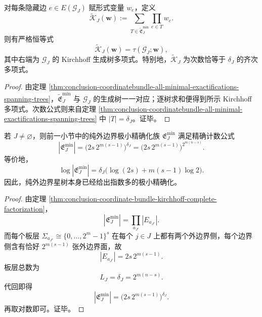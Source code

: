 \begin{corollary}\label{cor:conclusion-coordinatebundle-full-exactification-kirchhoff-polynomial}
对每条隐藏边 \(e\in E(\mathcal G_J)\) 赋形式变量 \(w_e\)，定义
\[
\widetilde{\mathcal K}_J(\mathbf w)
:=
\sum_{T\in \widetilde{\mathfrak E}_J^{\min}}
\prod_{e\in T}w_e.
\]
则有严格恒等式
\[
\widetilde{\mathcal K}_J(\mathbf w)
=
\tau(\mathcal G_J;\mathbf w),
\]
其中右端为 \(\mathcal G_J\) 的 Kirchhoff 生成树多项式。特别地，\(\widetilde{\mathcal K}_J\) 为次数恰等于 \(\delta_J\) 的齐次多项式。
\end{corollary}
\begin{proof}
由定理 \ref{thm:conclusion-coordinatebundle-all-minimal-exactifications-spanning-trees}，\(\widetilde{\mathfrak E}_J^{\min}\) 与 \(\mathcal G_J\) 的生成树一一对应；逐树求和便得到所示 Kirchhoff 多项式。次数公式则来自定理 \ref{thm:conclusion-coordinatebundle-all-minimal-exactifications-spanning-trees} 中 \(|T|=\delta_J\)。证毕。
\end{proof}

\begin{corollary}[纯外边界星树子族的精确计数]\label{cor:conclusion-coordinatebundle-pure-boundary-star-family-count}
若 \(J\neq\varnothing\)，则前一小节中的纯外边界极小精确化族 \(\mathfrak E_J^{\min}\) 满足精确计数公式
\[
|\mathfrak E_J^{\min}|
=
\bigl(2s\,2^{m(s-1)}\bigr)^{\delta_J}
=
\bigl(2s\,2^{m(s-1)}\bigr)^{2^{m(n-s)}}.
\]
等价地，
\[
\log |\mathfrak E_J^{\min}|
=
\delta_J\bigl(\log(2s)+m(s-1)\log 2\bigr).
\]
因此，纯外边界星树本身已经给出指数多的极小精确化。
\end{corollary}
\begin{proof}
由定理 \ref{thm:conclusion-coordinate-bundle-kirchhoff-complete-factorization}，
\[
|\mathfrak E_J^{\min}|=\prod_{a_{J^c}}|E_{a_{J^c}}|.
\]
而每个板层 \(\Sigma_{a_{J^c}} \cong \{0,\dots,2^m-1\}^s\) 在每个 \(j\in J\) 上都有两个外边界侧，每个边界侧含有恰好 \(2^{m(s-1)}\) 张外边界面，故
\[
|E_{a_{J^c}}|=2s\,2^{m(s-1)}.
\]
板层总数为
\[
L_J=\delta_J=2^{m(n-s)}.
\]
代回即得
\[
|\mathfrak E_J^{\min}|=\bigl(2s\,2^{m(s-1)}\bigr)^{\delta_J}.
\]
再取对数即可。证毕。
\end{proof}

